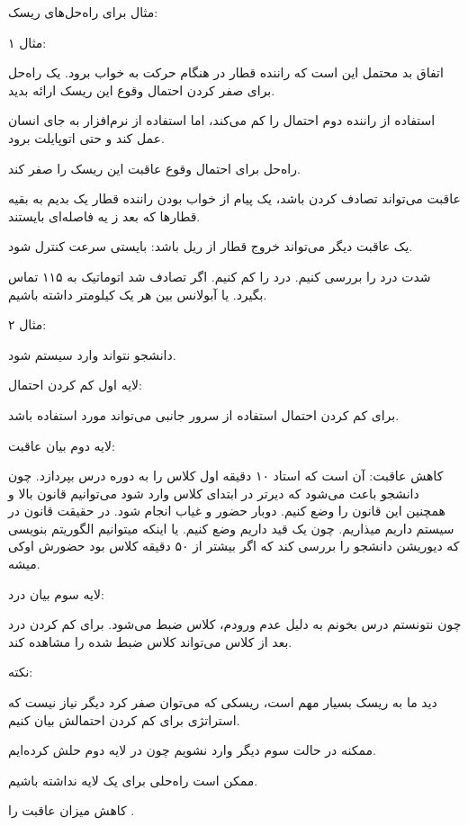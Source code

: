 مثال برای راه‌حل‌های ریسک:

مثال ۱:

اتفاق بد محتمل این است که راننده قطار در هنگام حرکت به خواب برود. یک راه‌حل برای
صفر کردن احتمال وقوع این ریسک ارائه بدید.

استفاده از راننده دوم احتمال را کم می‌کند، اما استفاده از نرم‌افزار به جای انسان
عمل کند و حتی اتوپایلت برود.

راه‌حل برای احتمال وقوع عاقبت این ریسک را صفر کند.

عاقبت می‌تواند تصادف کردن باشد، یک پیام از خواب بودن راننده قطار یک بدیم به بقیه
قطار‌ها که بعد ز یه فاصله‌ای بایستند.

یک عاقبت دیگر می‌تواند خروج قطار از ریل باشد: بایستی سرعت کنترل شود.

شدت درد را بررسی کنیم. درد را کم کنیم. اگر تصادف شد اتوماتیک به ۱۱۵ تماس بگیرد.
یا آبولانس بین هر یک کیلومتر داشته باشیم.


مثال ۲:

دانشجو نتواند وارد سیستم  شود.

لایه اول کم کردن احتمال:

برای کم کردن احتمال استفاده از سرور جانبی می‌تواند مورد استفاده باشد.

لایه دوم بیان عاقبت:

کاهش عاقبت: آن است که استاد ۱۰ دقیقه اول کلاس را به دوره درس بپردازد.  چون
دانشجو باعث می‌شود که دیرتر در ابتدای کلاس وارد شود می‌توانیم قانون بالا و
همچنین این قانون را وضع کنیم. دوبار حضور و غیاب انجام شود. در حقیقت قانون در
سیستم داریم میذاریم. چون یک قید داریم وضع کنیم. یا اینکه میتوانیم الگوریتم
بنویسی که دیوریشن دانشجو را بررسی کند که اگر بیشتر از ۵۰ دقیقه کلاس بود حضورش
اوکی میشه.

لایه سوم بیان درد:

چون نتونستم درس بخونم به دلیل عدم ورودم، کلاس ضبط می‌شود.  برای کم کردن درد بعد
از کلاس می‌تواند کلاس ضبط شده را مشاهده کند.

نکته:

دید ما به ریسک بسیار مهم است، ریسکی که می‌توان صفر کرد دیگر نیاز نیست که
استراتژی برای کم کردن احتمالش بیان کنیم.

ممکنه در حالت سوم دیگر وارد نشویم چون در لایه دوم حلش کرده‌ایم.

ممکن است راه‌حلی برای یک لایه نداشته باشیم.

کاهش میزان عاقبت را .

